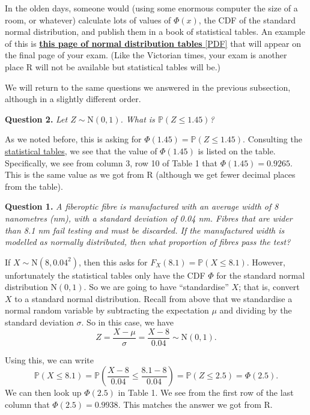 \documentclass[
  a4paper,
]{book}
\theoremstyle{definition}
\theoremstyle{definition}
\theoremstyle{definition}
\theoremstyle{definition}
\theoremstyle{remark}
\begin{document}
In the olden days, someone would (using some enormous computer the size of a room, or whatever) calculate lots of values of \(\Phi(x)\), the CDF of the standard normal distribution, and publish them in a book of statistical tables. An example of this is \href{https://mpaldridge.github.io/math1710/stat-tab.pdf}{\textbf{this page of normal distribution tables} {[}PDF{]}} that will appear on the final page of your exam. (Like the Victorian times, your exam is another place R will not be available but statistical tables will be.)

We will return to the same questions we answered in the previous subsection, although in a slightly different order.

\textbf{Question 2.} \emph{Let \(Z \sim \mathrm{N}(0,1)\). What is \(\mathbb P(Z \leq 1.45)\)?}

As we noted before, this is asking for \(\Phi(1.45) = \mathbb P(Z \leq 1.45)\). Consulting the \href{https://mpaldridge.github.io/math1710/stat-tab.pdf}{statistical tables}, we see that the value of \(\Phi(1.45)\) is listed on the table. Specifically, we see from column 3, row 10 of Table 1 that \(\Phi(1.45) = 0.9265\). This is the same value as we got from R (although we get fewer decimal places from the table).

\textbf{Question 1.} \emph{A fiberoptic fibre is manufactured with an average width of 8 nanometres (nm), with a standard deviation of 0.04 nm. Fibres that are wider than 8.1 nm fail testing and must be discarded. If the manufactured width is modelled as normally distributed, then what proportion of fibres pass the test?}

If \(X \sim \mathrm{N}(8, 0.04^2)\), then this asks for \(F_X(8.1) = \mathbb P(X \leq 8.1)\). However, unfortunately the statistical tables only have the CDF \(\Phi\) for the standard normal distribution \(\mathrm N(0,1)\). So we are going to have ``standardise'' \(X\); that is, convert \(X\) to a standard normal distribution.
Recall from above that we standardise a normal random variable by subtracting the expectation \(\mu\) and dividing by the standard deviation \(\sigma\). So in this case, we have
\[ Z = \frac{X - \mu}{\sigma} = \frac{X - 8}{0.04} \sim \mathrm{N}(0,1) . \]

Using this, we can write
\[ \mathbb P(X \leq 8.1) = \mathbb P \left(\frac{X - 8}{0.04} \leq \frac{8.1 - 8}{0.04}\right) = \mathbb P(Z \leq 2.5) = \Phi(2.5).  \]
We can then look up \(\Phi(2.5)\) in Table 1. We see from the first row of the last column that \(\Phi(2.5) = 0.9938\). This matches the answer we got from R.
\end{document}
